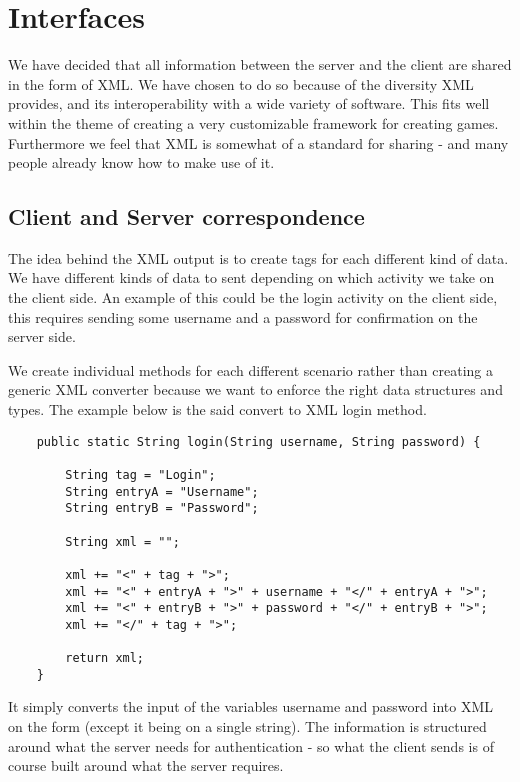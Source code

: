 \section{Interfaces}

We have decided that all information between the server and the client are shared in the form of XML. We have chosen to do so because of the diversity XML provides, and its interoperability with a wide variety of software. This fits well within the theme of creating a very customizable framework for creating games. Furthermore we feel that XML is somewhat of a standard for sharing - and many people already know how to make use of it.

\subsection{Client and Server correspondence}

The idea behind the XML output is to create tags for each different kind of data. We have different kinds of data to sent depending on which activity we take on the client side. An example of this could be the login activity on the client side, this requires sending some username and a password for confirmation on the server side.

We create individual methods for each different scenario rather than creating a generic XML converter because we want to enforce the right data structures and types. The example below is the said convert to XML login method. 

\begin{lstlisting}
    public static String login(String username, String password) {

        String tag = "Login";
        String entryA = "Username";
        String entryB = "Password";

        String xml = "";

        xml += "<" + tag + ">";
        xml += "<" + entryA + ">" + username + "</" + entryA + ">";
        xml += "<" + entryB + ">" + password + "</" + entryB + ">";
        xml += "</" + tag + ">";

        return xml;
    }
\end{lstlisting}

It simply converts the input of the variables username and password into XML on the form (except it being on a single string). The information is structured around what the server needs for authentication - so what the client sends is of course built around what the server requires.

